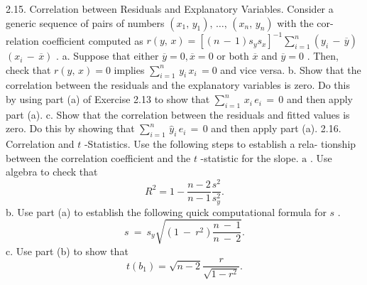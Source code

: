 \documentclass[11pt]{article}
\begin{document}
2.15. Correlation between Residuals and Explanatory Variables. Consider
 a generic sequence of pairs of numbers \(( x_{1} , \, y_{1} ) , \, \dots, \, ( x_{n} , \, y_{n} )\) with the cor-
 relation coefficient computed as \(r ( y , \, x )=\left[ ( n \,-\, 1 ) s_{y} s_{x} \right]^{-1} \sum_{i=1}^{n} \left( y_{i} \,-\, \overline{{y}} \right)\)
\(( x_{i} \,-\, \overline{{x}} )\) .
a. Suppose that either \(\overline{{y}}=0 , \overline{{x}}=0\) or both \(\overline{{x}}\) and \(\overline{{y}}=0\) . Then, check
 that \(r ( y , \, x )=0\) implies \(\sum_{i=1}^{n} \, y_{i} \, x_{i} \,=0\) and vice versa.
b. Show that the correlation between the residuals and the explanatory
variables is zero. Do this by using part (a) of Exercise 2.13 to show
that \(\sum_{i=1}^{n} \, x_{i} \, e_{i} \,=\, 0\) and then apply part (a).
c. Show that the correlation between the residuals and fitted values is
zero. Do this by showing that \(\sum_{i \mathop=1}^{n} \, \widehat{y}_{i} \, e_{i} \,=\, 0\) and then apply part (a).
2.16. Correlation and \(t\) -Statistics. Use the following steps to establish a rela-
 tionship between the correlation coefficient and the \(t\) -statistic for the slope.
\(\mathrm{a}\) . Use algebra to check that
\[
R^{2}=1-\frac{n-2} {n-1} \frac{s^{2}} {s_{y}^{2}} .
\]
 b. Use part (a) to establish the following quick computational formula
for \(s\) .
\[
s \:=\: s_{y} \sqrt{( 1 \:-\: r^{2} ) \frac{n \:-\: 1} {n \:-\: 2}} .
\]
c. Use part (b) to show that 
\[
t ( b_{1} )=\sqrt{n-2} \frac{r} {\sqrt{1-r^{2}}} .
\]
\end{document}
